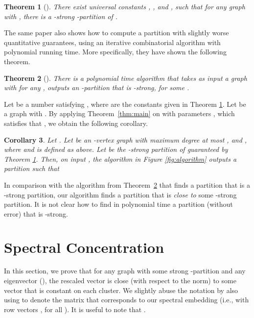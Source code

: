 \documentclass[11pt]{article}
\theoremstyle{plain}
\newtheorem{theorem}{Theorem}[section]
\newtheorem{corollary}[theorem]{Corollary}
\begin{document}
\begin{theorem}[\cite{DBLP:conf/soda/GharanT14}]\label{thm:OT_clustering} There
exist universal constants , , and , such that for any
graph  with , there is a
-strong -partition of .\label{OT-thm}
\end{theorem}

The same paper \cite{DBLP:conf/soda/GharanT14} also shows how to compute a
partition with slightly worse quantitative guarantees, using an iterative
combinatorial algorithm with polynomial running time. More specifically, they have shown the following theorem.
\begin{theorem}[\cite{DBLP:conf/soda/GharanT14}]\label{thm:OT_clustering_algorithm}
There is a polynomial time algorithm that takes as input a
graph  with  for any , outputs an
-partition that is -strong, for some .
\end{theorem}


Let  be a number satisfying , where  are the constants given
in Theorem \ref{thm:OT_clustering}. Let  be a graph with . By applying Theorem~\ref{thm:main} on  with parameters , which satisfies that , we obtain the following corollary. \begin{corollary}\label{cor:main}
Let . Let  be an -vertex graph with maximum degree at most , and , where  and  is defined as above. Let  be the -strong partition of 
guaranteed by Theorem \ref{thm:OT_clustering}. Then, on input , the algorithm
in Figure \ref{fig:algorithm} outputs a partition  such that

\end{corollary}
In comparison with the algorithm from Theorem~\ref{thm:OT_clustering_algorithm} that finds a partition that is a -strong partition, our algorithm finds a partition that is \emph{close to} some -strong partition. It is not clear how to find in polynomial time a partition (without error) that is -strong.  

\section{Spectral Concentration}\label{sec:concentration} In this section, we
prove that for any graph with some strong -partition and any eigenvector  (), the rescaled vector
 is close (with respect to the  norm) to
some vector  that is constant on each cluster. We slightly
abuse the notation by also using  to denote the  matrix that
corresponds to our spectral embedding (i.e., with row vectors , for all
). It is useful to note that .
\end{document}
